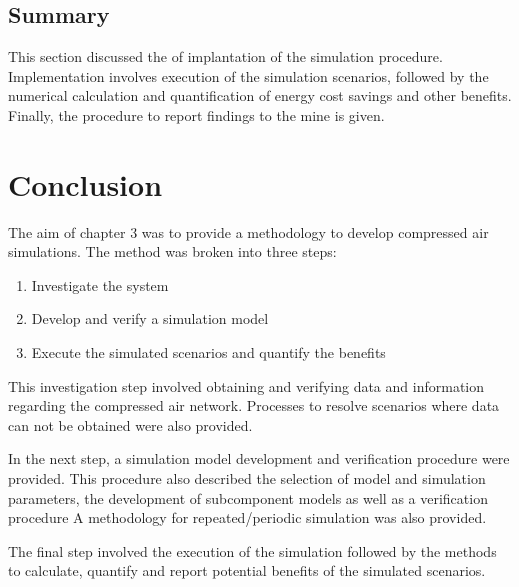 	\subsection{Summary}
	This section discussed the of implantation of the simulation procedure. Implementation involves execution of the simulation scenarios, followed by the numerical calculation and quantification of energy cost savings and other benefits. Finally, the procedure to report findings to the mine is given.
\section{Conclusion}
The aim of chapter 3 was to provide a methodology to develop compressed air simulations. The method was  broken into three steps:
\begin{enumerate}
	\item Investigate the system
	\item Develop and verify a simulation model
	\item Execute the simulated scenarios and quantify the benefits
\end{enumerate}
This investigation step involved obtaining and verifying data and information regarding the compressed air network. Processes to resolve scenarios where data can not be obtained were also provided.
\par 
In the next step, a simulation model development and verification procedure were provided. This procedure also described the selection of model and simulation parameters, the development of subcomponent models as well as a verification procedure A methodology for repeated/periodic simulation was also provided.
\par 
The final step involved the execution of the simulation followed by the methods to calculate, quantify and report potential benefits of the simulated scenarios.
